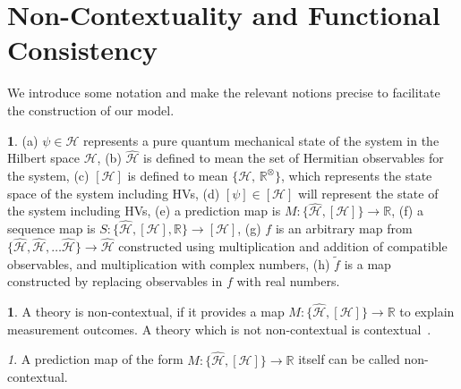 \documentclass[doublecol,british]{epl2}
\theoremstyle{plain}
\theoremstyle{plain}
\theoremstyle{definition}
\newtheorem{defn}{\protect\definitionname}
\theoremstyle{remark}
\theoremstyle{remark}
\newtheorem{defnrem}{\protect\remarkname}[defn]
\theoremstyle{remark}
\theoremstyle{plain}
\theoremstyle{plain}
\theoremstyle{plain}
\theoremstyle{definition}
\theoremstyle{definition}
\newtheorem*{notn*}{\protect\notationname}
\providecommand{\definitionname}{Definition}
\providecommand{\remarkname}{Remark}
\providecommand{\notationname}{Notation}
\begin{document}
\section{Non-Contextuality and Functional Consistency}
We introduce some notation and make the relevant notions
precise to facilitate the construction of our
model.
\begin{notn*}
(a) $\psi\in\mathcal{H}$ represents a pure quantum
mechanical state of the system in the Hilbert
space $\mathcal{H}$, (b) $\hat{\mathcal{H}}$ is
defined to mean the set of Hermitian observables
for the system, (c) $[\mathcal{H}]$ is defined to
mean $\{\mathcal{H},\,\mathbb{R}^{\otimes}\}$, which
represents the state  space of the
system including HVs, (d) $[\psi]\in[\mathcal{H}]$
will represent the state of the system including
HVs, (e) a prediction map is $M:\{
\hat{\mathcal{H}},[\mathcal{H}] \}\to\mathbb{R}$,
(f) a sequence map is $S:\{
\hat{\mathcal{H}},[\mathcal{H}],\mathbb{R}
\}\to[\mathcal{H}]$, (g) $f$ is an arbitrary map
from $\{
\hat{\mathcal{H}},\hat{\mathcal{H}},\dots\hat{\mathcal{H}}
\} \to \hat{\mathcal{H}}$ constructed using
multiplication and addition of compatible
observables, and multiplication with complex
numbers, (h) $\tilde{f}$ is a map constructed by
replacing observables in $f$ with real numbers.
\end{notn*}
\begin{defn} A theory is non-contextual, if it
provides a map $M: \{
\hat{\mathcal{H}},[\mathcal{H}] \} \to\mathbb{R}$
to explain measurement outcomes. A theory which is
not non-contextual is contextual~\cite{peresBook}.
\end{defn}

\begin{defnrem}
A prediction map of the form {$M: \{
\hat{\mathcal{H}},[\mathcal{H}] \} \to\mathbb{R}$}
itself can be called  non-contextual.
\end{defnrem}
\end{document}
